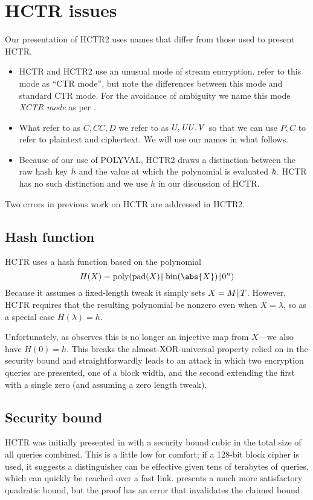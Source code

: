 \documentclass[hctr2.tex]{subfiles}
\begin{document}
\section{HCTR issues}
Our presentation of HCTR2 uses
names that differ from those used to present HCTR\@.

\begin{itemize}
    \item HCTR and HCTR2 use an unusual mode of stream encryption.
    \cite{hctr,hctrquad} refer to this mode as ``CTR mode'',
    but note the differences between this mode and 
    standard CTR mode\cite{ctr}.
    For the avoidance of ambiguity
    we name this mode \emph{XCTR mode} as per \cite{hmc}.
    \item What \cite{hctr,hctrquad} refer to as \(C, \mathit{CC}, D\)
    we refer to as \(U, \mathit{UU}, V\)
    so that we can use \(P, C\) to refer to plaintext and ciphertext.
    We will use our names in what follows.
    \item Because of our use of POLYVAL, HCTR2 draws a distinction
    between the raw hash key \(\bar{h}\)
    and the value at which the polynomial is evaluated \(h\).
    HCTR has no such distinction
    and we use \(h\) in our discussion of HCTR\@.
\end{itemize}

Two errors in previous work on HCTR are addressed in HCTR2.

\subsection{Hash function}\label{badhash}
HCTR uses a hash function based on the polynomial
\begin{displaymath}
    H(X) = \poly(\pad(X) \Concat \fromint(\abs{X}) \Concat 0^n)
\end{displaymath}
Because it assumes a fixed-length tweak it simply sets \(X = M \Vert T\).
However, HCTR requires that the resulting polynomial be nonzero
even when \(X = \lambda\),
so as a special case \(H(\lambda) = h\).

Unfortunately, as \cite{kumarhctr} observes this is no longer
an injective map from \(X\)---we also have \(H(0) = h\). This
breaks the almost-XOR-universal property relied on
in the security bound and
straightforwardly leads to an attack in which two encryption queries
are presented, one of a block width, and the second extending
the first with a single zero (and assuming a zero length tweak).

\subsection{Security bound}\label{badproof}
HCTR was initially presented in \cite{hctr} with a security bound cubic
in the total size of all queries combined.  This is a little low
for comfort; if a 128-bit block cipher is used, it suggests a
distinguisher can be effective given tens of terabytes of queries,
which can quickly be reached over a fast link. 
\cite{hctrquad} presents a much more satisfactory quadratic bound,
but the proof has an error that invalidates the claimed bound.
\end{document}

